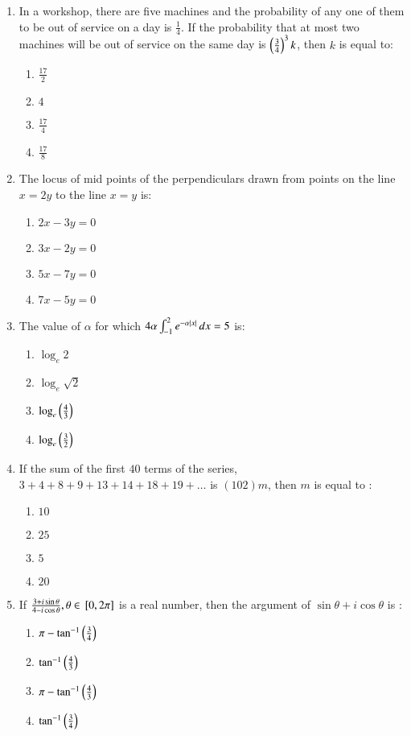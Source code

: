 \documentclass[journal,12pt,twocolumn]{IEEEtran}
\theoremstyle{remark}
\begin{document}
\begin{enumerate}
    \item In a workshop, there are five machines and the probability of any one of them to be out of service on a day is $\frac{1}{4}$. If the probability that at most two machines will be out of service on the same day is $\left(\frac{3}{4}\right)^3k$, then $k$ is equal to:
        \begin{enumerate}
            \item $\frac{17}{2}$
            \item $4$
            \item $\frac{17}{4}$
            \item $\frac{17}{8}$
        \end{enumerate}

    \item The locus of mid points of the perpendiculars drawn from points on the line $x=2y$ to the line $x=y$ is:
        \begin{enumerate}
            \item $2x-3y=0$
            \item $3x-2y=0$
            \item $5x-7y=0$
            \item $7x-5y=0$
        \end{enumerate}

    \item The value of $\alpha$ for which $4\alpha\int_{-1}^{2}e^{-\alpha\left\vert x\right\vert}\,dx=5$ is: 
        \begin{enumerate}
            \item $\log_e2$
            \item $\log_e\sqrt{2}$
            \item $\log_e\left(\frac{4}{3}\right)$
            \item $\log_e\left(\frac{3}{2}\right)$
        \end{enumerate}

    \item If the sum of the first $40$ terms of the series, $3 + 4 + 8 + 9 + 13 + 14 + 18 + 19 + \dots$ is $(102)m$, then $m$ is equal to :
        \begin{enumerate}
            \item $10$
            \item $25$
            \item $5$
            \item $20$
        \end{enumerate}

    \item If $\frac{3+i\sin\theta}{4-i\cos\theta}, \theta\in{}\left[0,2\pi\right]$ is a real number, then the argument of $\sin\theta+i\cos\theta$ is :
        \begin{enumerate}
            \item $\pi-\tan^{-1}\left(\frac{3}{4}\right)$
            \item $\tan^{-1}\left(\frac{4}{3}\right)$
            \item $\pi-\tan^{-1}\left(\frac{4}{3}\right)$
            \item $\tan^{-1}\left(\frac{3}{4}\right)$
        \end{enumerate}


\end{enumerate}
\end{document}
